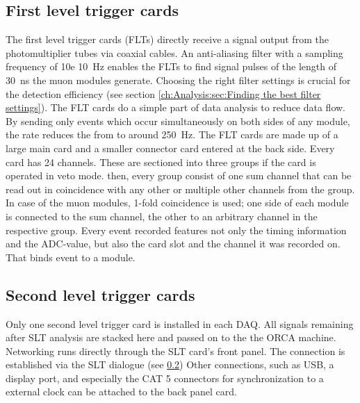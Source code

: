   \subsection{First level trigger cards}
  \label{ch:The muon detection system: sec: DAQ:subsec:FLTs}
  The first level trigger cards (FLTs) directly receive a signal output from the photomultiplier tubes via coaxial cables. An anti-aliasing filter with a sampling frequency of \SI{10e 10}{\hertz} enables the FLTs to find signal pulses of the length of \SI{30}{\nano\second} the muon modules generate. Choosing the right filter settings is crucial for the detection efficiency (see section \ref{ch:Analysis:sec:Finding the best filter settings}). The FLT cards do a simple part of data analysis to reduce data flow. By sending only events which occur simultaneously on both sides of any module, the rate reduces the from  to around \SI{250}{\hertz}. The FLT cards are made up of a large main card and a smaller connector card entered at the back side. Every card has 24 channels. These are sectioned into three groups if the card is operated in veto mode. then, every group consist of one sum channel that can be read out in coincidence with any other or multiple other channels from the group. In case of the muon modules, 1-fold coincidence is used; one side of each module is connected to the sum channel, the other to an arbitrary channel in the respective group. Every event recorded features not only the timing information and the ADC-value, but also the card slot and the channel it was recorded on. That binds event to a module.
  
  \subsection{Second level trigger cards}
  \label{ch:The muon detection system: sec: DAQ:subsec:SLTs}
  Only one second level trigger card is installed in each DAQ. All signals remaining after SLT analysis are stacked here and passed on to the the ORCA machine. Networking runs directly through the SLT card's front panel. The connection is established via the SLT dialogue (see \ref{ch:The muon detection system: sec: DAQ:subsec:SLTs}) Other connections, such as USB, a display port, and especially the CAT 5 connectors for synchronization to a external clock can be attached to the back panel card. 


